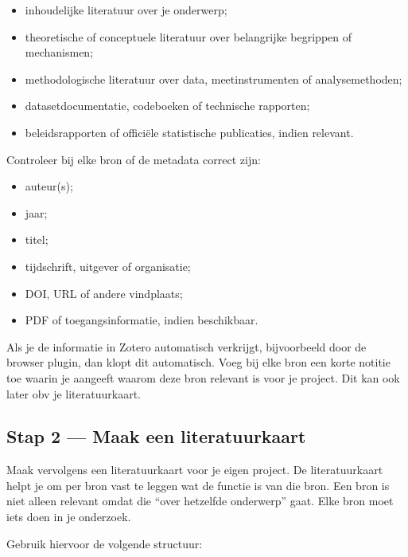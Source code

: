 \documentclass[
  letterpaper,
  DIV=11,
  numbers=noendperiod]{scrreprt}
\providecommand{\tightlist}{%
  \setlength{\itemsep}{0pt}\setlength{\parskip}{0pt}}
\begin{document}
\begin{itemize}
\tightlist
\item
  inhoudelijke literatuur over je onderwerp;
\item
  theoretische of conceptuele literatuur over belangrijke begrippen of
  mechanismen;
\item
  methodologische literatuur over data, meetinstrumenten of
  analysemethoden;
\item
  datasetdocumentatie, codeboeken of technische rapporten;
\item
  beleidsrapporten of officiële statistische publicaties, indien
  relevant.
\end{itemize}

Controleer bij elke bron of de metadata correct zijn:

\begin{itemize}
\tightlist
\item
  auteur(s);
\item
  jaar;
\item
  titel;
\item
  tijdschrift, uitgever of organisatie;
\item
  DOI, URL of andere vindplaats;
\item
  PDF of toegangsinformatie, indien beschikbaar.
\end{itemize}

Als je de informatie in Zotero automatisch verkrijgt, bijvoorbeeld door
de browser plugin, dan klopt dit automatisch. Voeg bij elke bron een
korte notitie toe waarin je aangeeft waarom deze bron relevant is voor
je project. Dit kan ook later obv je literatuurkaart.

\subsection{Stap 2 --- Maak een
literatuurkaart}\label{stap-2-maak-een-literatuurkaart}

Maak vervolgens een literatuurkaart voor je eigen project. De
literatuurkaart helpt je om per bron vast te leggen wat de functie is
van die bron. Een bron is niet alleen relevant omdat die ``over
hetzelfde onderwerp'' gaat. Elke bron moet iets doen in je onderzoek.

Gebruik hiervoor de volgende structuur:
\end{document}
